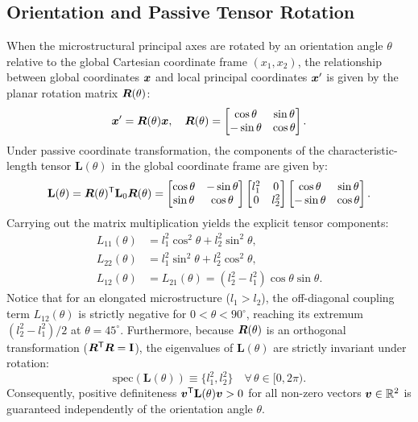 \subsection{Orientation and Passive Tensor Rotation}
When the microstructural principal axes are rotated by an orientation angle $\theta$ relative to the global Cartesian coordinate frame $(x_1, x_2)$, the relationship between global coordinates $\bm{x}$ and local principal coordinates $\bm{x}'$ is given by the planar rotation matrix $\bm{R}(\theta)$:
\begin{equation}
\bm{x}' = \bm{R}(\theta)\bm{x}, \quad \bm{R}(\theta) = \begin{bmatrix} \cos\theta & \sin\theta \\ -\sin\theta & \cos\theta \end{bmatrix}.
\label{eq:R_matrix}
\end{equation}
Under passive coordinate transformation, the components of the characteristic-length tensor $\mathbf{L}(\theta)$ in the global coordinate frame are given by:
\begin{equation}
\mathbf{L}(\theta) = \bm{R}(\theta)^\mathsf{T} \mathbf{L}_0 \bm{R}(\theta) = \begin{bmatrix} \cos\theta & -\sin\theta \\ \sin\theta & \cos\theta \end{bmatrix} \begin{bmatrix} l_1^2 & 0 \\ 0 & l_2^2 \end{bmatrix} \begin{bmatrix} \cos\theta & \sin\theta \\ -\sin\theta & \cos\theta \end{bmatrix}.
\label{eq:L_rotation}
\end{equation}
Carrying out the matrix multiplication yields the explicit tensor components:
\begin{subequations}
\label{eq:L_components}
\begin{align}
L_{11}(\theta) &= l_1^2 \cos^2\theta + l_2^2 \sin^2\theta, \label{eq:L11} \\
L_{22}(\theta) &= l_1^2 \sin^2\theta + l_2^2 \cos^2\theta, \label{eq:L22} \\
L_{12}(\theta) &= L_{21}(\theta) = (l_2^2 - l_1^2)\cos\theta\sin\theta. \label{eq:L12}
\end{align}
\end{subequations}
Notice that for an elongated microstructure ($l_1 > l_2$), the off-diagonal coupling term $L_{12}(\theta)$ is strictly negative for $0 < \theta < 90^\circ$, reaching its extremum $(l_2^2 - l_1^2)/2$ at $\theta = 45^\circ$. Furthermore, because $\bm{R}(\theta)$ is an orthogonal transformation ($\bm{R}^\mathsf{T}\bm{R} = \mathbf{I}$), the eigenvalues of $\mathbf{L}(\theta)$ are strictly invariant under rotation:
\begin{equation}
\mathrm{spec}(\mathbf{L}(\theta)) \equiv \{l_1^2, l_2^2\} \quad \forall\,\theta \in [0, 2\pi).
\label{eq:eigenvalues_invariant}
\end{equation}
Consequently, positive definiteness $\bm{v}^\mathsf{T}\mathbf{L}(\theta)\bm{v} > 0$ for all non-zero vectors $\bm{v} \in \mathbb{R}^2$ is guaranteed independently of the orientation angle $\theta$.

